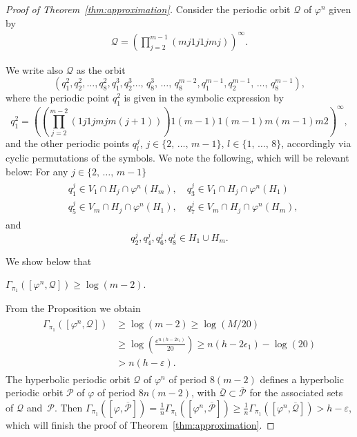 \documentclass[AHL,Unicode,longabstracts,published]{cedram}
\newcommand{\clP}{\mathcal{P}}
\newcommand{\clQ}{\mathcal{Q}}
\begin{document}
\begin{proof}[Proof of Theorem~\ref{thm:approximation}]
Consider the periodic orbit $\clQ$ of $\varphi^n$ given by
\begin{align*}
\clQ = \left(\prod_{j=2}^{m-1}(mj1j1jmj)\right)^{\infty}.
\end{align*}

We write also $\clQ$ as the orbit
\begin{equation}\label{qqqq}
\left(q_1^2, q_2^2, \ldots, q_8^2, q_1^3, q_2^3 \ldots,\, q_8^3, \,\ldots,\, q_8^{m-2}, q_1^{m-1}, q_2^{m-1},\, \ldots,\, q_8^{m-1}\right),
\end{equation}
where the periodic point $q_1^2$ is given in the symbolic expression by
\[
q_1^2 = \left(\left(\prod_{j=2}^{m-2}(1j1jmjm(j+1))\right) 1(m-1)1(m-1)m(m-1)m2\right)^{\infty},
\]
and the other periodic points $q_l^j$, $j\in \{2,\,\ldots,\, m-1\}$, $l\in \{1,\,\ldots,\,8\}$, accordingly via cyclic permutations of the symbols.
We note the following, which will be relevant below: For any $j \in \{2,\,\ldots,\,m-1\}$
\begin{align}\label{1jm}
\begin{split} 
&q_1^j \in V_1 \cap H_j \cap \varphi^n(H_m), \quad
q_3^j\in V_1 \cap H_j \cap \varphi^n(H_1) \\
& q_5^j\in V_m \cap H_j \cap \varphi^n(H_1), \quad q_7^j\in V_m \cap H_j \cap \varphi^n(H_m),
\end{split}
\end{align}
and
\begin{equation}\label{11mm}
q_2^j,q_4^j, q_6^j, q_8^j \in H_1 \cup H_m.
\end{equation}



We show below that

\begin{prop}\label{prop:entropybound}
$\Gamma_{\pi_1}([\varphi^n, \clQ]) \geq \log(m-2)$.
\end{prop}

From the Proposition we obtain
\begin{align}
\begin{split}
\Gamma_{\pi_1}([\varphi^n, \clQ]) &\geq \log(m-2) \geq \log(M/20) \\ &\geq \log\left(\frac{e^{n(h-2\epsilon_1)}}{20}\right) \geq n(h-2\epsilon_1) - \log(20) \\ &> n(h-\varepsilon).
\end{split}
\end{align}
The hyperbolic periodic orbit $\clQ$ of $\varphi^n$ of period $8(m-2)$ defines a hyperbolic periodic orbit $\clP$ of $\varphi$ of period $8n(m-2)$, with $\overline{\clQ} \subset \overline{\clP}$ for the associated sets of $\clQ$ and~$\clP$. Then $\Gamma_{\pi_1}([\varphi,\overline{\clP}]) = \frac{1}{n}\Gamma_{\pi_1}([\varphi^n,\overline{\clP}]) \geq \frac{1}{n} \Gamma_{\pi_1}([\varphi^n, \overline{\clQ}]) > h-\varepsilon$, which will finish the proof of Theorem~\ref{thm:approximation}.
\end{proof}
\end{document}
